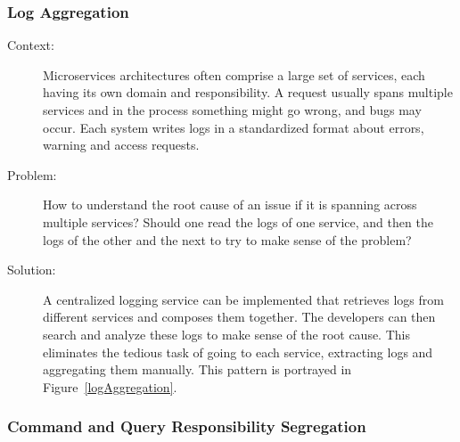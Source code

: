 \documentclass{bmcart}
\begin{document}

\subsubsection{Log Aggregation}

\begin{description}
  \item[Context:] Microservices architectures often comprise a large set of services, each having its own domain and responsibility. A request usually spans multiple services and in the process something might go wrong, and bugs may occur. Each system writes logs in a standardized format about errors, warning and access requests. 
  \item[Problem:] How to understand the root cause of an issue if it is spanning across multiple services? Should one read the logs of one service, and then the logs of the other and the next to try to make sense of the problem?  
  \item[Solution:] A centralized logging service can be implemented that retrieves logs from different services and composes them together. The developers can then search and analyze these logs to make sense of the root cause. This eliminates the tedious task of going to each service, extracting logs and aggregating them manually. This pattern is portrayed in Figure~\ref{logAggregation}.    
\end{description}



\subsubsection{Command and Query Responsibility Segregation}
\end{document}
